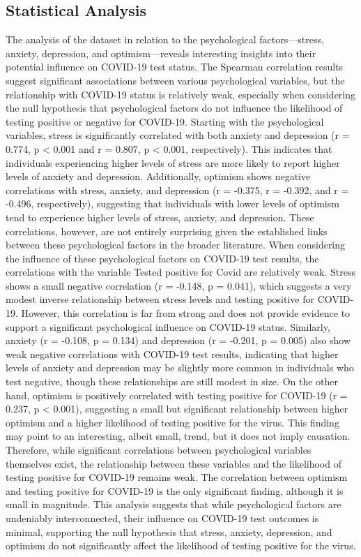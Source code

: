 \documentclass[a4paper]{article}
\begin{document}
\subsection{Statistical Analysis}
\vspace{0.5em}
The analysis of the dataset in relation to the psychological factors—stress, anxiety, depression, and optimism—reveals interesting insights into their potential influence on COVID-19 test status. The Spearman correlation results suggest significant associations between various psychological variables, but the relationship with COVID-19 status is relatively weak, especially when considering the null hypothesis that psychological factors do not influence the likelihood of testing positive or negative for COVID-19.\newline
Starting with the psychological variables, stress is significantly correlated with both anxiety and depression (r = 0.774, p < 0.001 and r = 0.807, p < 0.001, respectively). This indicates that individuals experiencing higher levels of stress are more likely to report higher levels of anxiety and depression. Additionally, optimism shows negative correlations with stress, anxiety, and depression (r = -0.375, r = -0.392, and r = -0.496, respectively), suggesting that individuals with lower levels of optimism tend to experience higher levels of stress, anxiety, and depression. These correlations, however, are not entirely surprising given the established links between these psychological factors in the broader literature.
When considering the influence of these psychological factors on COVID-19 test results, the correlations with the variable Tested positive for Covid are relatively weak. Stress shows a small negative correlation (r = -0.148, p = 0.041), which suggests a very modest inverse relationship between stress levels and testing positive for COVID-19. However, this correlation is far from strong and does not provide evidence to support a significant psychological influence on COVID-19 status. Similarly, anxiety (r = -0.108, p = 0.134) and depression (r = -0.201, p = 0.005) also show weak negative correlations with COVID-19 test results, indicating that higher levels of anxiety and depression may be slightly more common in individuals who test negative, though these relationships are still modest in size. On the other hand, optimism is positively correlated with testing positive for COVID-19 (r = 0.237, p < 0.001), suggesting a small but significant relationship between higher optimism and a higher likelihood of testing positive for the virus. This finding may point to an interesting, albeit small, trend, but it does not imply causation.
Therefore, while significant correlations between psychological variables themselves exist, the relationship between these variables and the likelihood of testing positive for COVID-19 remains weak. The correlation between optimism and testing positive for COVID-19 is the only significant finding, although it is small in magnitude. This analysis suggests that while psychological factors are undeniably interconnected, their influence on COVID-19 test outcomes is minimal, supporting the null hypothesis that stress, anxiety, depression, and optimism do not significantly affect the likelihood of testing positive for the virus.
\end{document}
